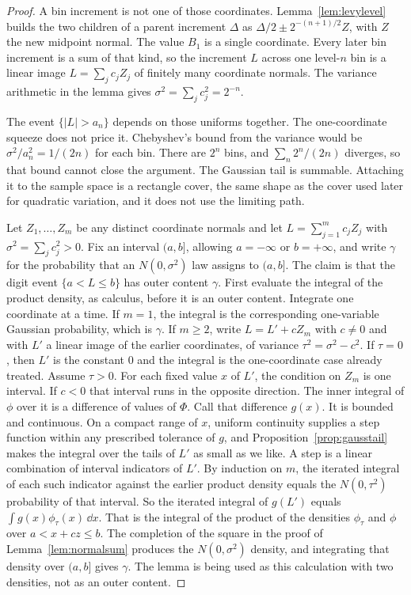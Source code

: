 \begin{proof}
A bin increment is not one of those coordinates. Lemma~\ref{lem:levylevel} builds the two children of a parent increment $\Delta$ as $\Delta/2\pm 2^{-(n+1)/2}Z$, with $Z$ the new midpoint normal. The value $B_1$ is a single coordinate. Every later bin increment is a sum of that kind, so the increment $L$ across one level-$n$ bin is a linear image $L=\sum_j c_j Z_j$ of finitely many coordinate normals. The variance arithmetic in the lemma gives $\sigma^2=\sum_j c_j^2=2^{-n}$.

The event $\{|L|>a_n\}$ depends on those uniforms together. The one-coordinate squeeze does not price it. Chebyshev's bound from the variance would be $\sigma^2/a_n^2=1/(2n)$ for each bin. There are $2^n$ bins, and $\sum_n 2^n/(2n)$ diverges, so that bound cannot close the argument. The Gaussian tail is summable. Attaching it to the sample space is a rectangle cover, the same shape as the cover used later for quadratic variation, and it does not use the limiting path.

Let $Z_1,\ldots,Z_m$ be any distinct coordinate normals and let $L=\sum_{j=1}^m c_j Z_j$ with $\sigma^2=\sum_j c_j^2>0$. Fix an interval $(a,b]$, allowing $a=-\infty$ or $b=+\infty$, and write $\gamma$ for the probability that an $N(0,\sigma^2)$ law assigns to $(a,b]$. The claim is that the digit event $\{a<L\le b\}$ has outer content $\gamma$. First evaluate the integral of the product density, as calculus, before it is an outer content. Integrate one coordinate at a time. If $m=1$, the integral is the corresponding one-variable Gaussian probability, which is $\gamma$. If $m\ge 2$, write $L=L'+cZ_m$ with $c\neq 0$ and with $L'$ a linear image of the earlier coordinates, of variance $\tau^2=\sigma^2-c^2$. If $\tau=0$, then $L'$ is the constant $0$ and the integral is the one-coordinate case already treated. Assume $\tau>0$. For each fixed value $x$ of $L'$, the condition on $Z_m$ is one interval. If $c<0$ that interval runs in the opposite direction. The inner integral of $\phi$ over it is a difference of values of $\Phi$. Call that difference $g(x)$. It is bounded and continuous. On a compact range of $x$, uniform continuity supplies a step function within any prescribed tolerance of $g$, and Proposition~\ref{prop:gausstail} makes the integral over the tails of $L'$ as small as we like. A step is a linear combination of interval indicators of $L'$. By induction on $m$, the iterated integral of each such indicator against the earlier product density equals the $N(0,\tau^2)$ probability of that interval. So the iterated integral of $g(L')$ equals $\int g(x)\phi_\tau(x)\,\dd x$. That is the integral of the product of the densities $\phi_\tau$ and $\phi$ over $a<x+cz\le b$. The completion of the square in the proof of Lemma~\ref{lem:normalsum} produces the $N(0,\sigma^2)$ density, and integrating that density over $(a,b]$ gives $\gamma$. The lemma is being used as this calculation with two densities, not as an outer content.


\end{proof}
